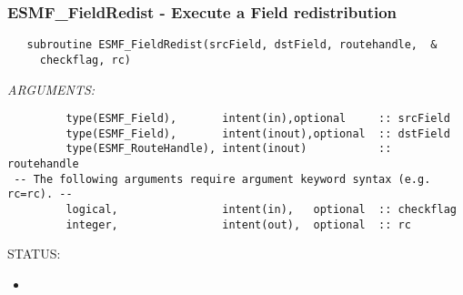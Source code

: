  
\setlength{\oldparskip}{\parskip}
\setlength{\parskip}{1.5ex}
\setlength{\oldparindent}{\parindent}
\setlength{\parindent}{0pt}
\setlength{\oldbaselineskip}{\baselineskip}
\setlength{\baselineskip}{11pt}
 
\def\bv{\begin{verbatim}}
\def\ev{\end{verbatim}}
\def\be{\begin{equation}}
\def\ee{\end{equation}}
\def\bea{\begin{eqnarray}}
\def\eea{\end{eqnarray}}
\def\bi{\begin{itemize}}
\def\ei{\end{itemize}}
\def\bn{\begin{enumerate}}
\def\en{\end{enumerate}}
\def\bd{\begin{description}}
\def\ed{\end{description}}
\def\({\left (}
\def\){\right )}
\def\[{\left [}
\def\]{\right ]}
\def\<{\left  \langle}
\def\>{\right \rangle}
\def\cI{{\cal I}}
\def\diag{\mathop{\rm diag}}
\def\tr{\mathop{\rm tr}}


 
\subsubsection [ESMF\_FieldRedist] {ESMF\_FieldRedist - Execute a Field redistribution}


  
\begin{verbatim}   subroutine ESMF_FieldRedist(srcField, dstField, routehandle,  &
     checkflag, rc)\end{verbatim}{\em ARGUMENTS:}
\begin{verbatim}         type(ESMF_Field),       intent(in),optional     :: srcField
         type(ESMF_Field),       intent(inout),optional  :: dstField
         type(ESMF_RouteHandle), intent(inout)           :: routehandle
 -- The following arguments require argument keyword syntax (e.g. rc=rc). --
         logical,                intent(in),   optional  :: checkflag
         integer,                intent(out),  optional  :: rc\end{verbatim}
{\sf STATUS:}
   \begin{itemize}
   \item{}
   \end{itemize}
  
